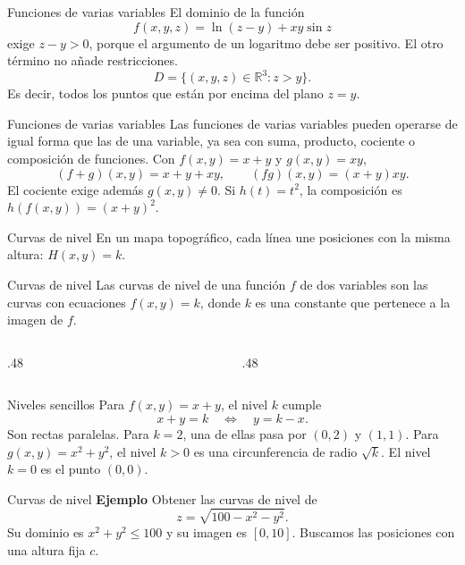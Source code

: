 \begin{frame}{Funciones de varias variables}
El dominio de la función
\[f(x,y,z)=\ln(z-y)+xy\sin z\]
exige $z-y>0$, porque el argumento de un logaritmo debe ser positivo. El otro término no añade restricciones.
\[D=\{(x,y,z)\in\mathbb{R}^3:z>y\}.\]
Es decir, todos los puntos que están por encima del plano $z=y$.
\end{frame}
\begin{frame}{Funciones de varias variables}
Las funciones de varias variables pueden operarse de igual forma que las de una variable, ya sea con suma, producto, cociente o composición de funciones.
\medskip
Con $f(x,y)=x+y$ y $g(x,y)=xy$,
\[(f+g)(x,y)=x+y+xy,\qquad (fg)(x,y)=(x+y)xy.\]
El cociente exige además $g(x,y)\ne0$.
\medskip
Si $h(t)=t^2$, la composición es $h(f(x,y))=(x+y)^2$.
\end{frame}
\begin{frame}{Curvas de nivel}
En un mapa topográfico, cada línea une posiciones con la misma altura: $H(x,y)=k$.
\end{frame}
\begin{frame}{Curvas de nivel}
Las curvas de nivel de una función $f$ de dos variables son las curvas con ecuaciones $f(x,y)=k$, donde $k$ es una constante que pertenece a la imagen de $f$.
\begin{columns}[c]
\begin{column}{.48\textwidth}\end{column}
\begin{column}{.48\textwidth}\end{column}
\end{columns}
\end{frame}
\begin{frame}{Niveles sencillos}
Para $f(x,y)=x+y$, el nivel $k$ cumple
\[x+y=k\quad\Longleftrightarrow\quad y=k-x.\]
Son rectas paralelas. Para $k=2$, una de ellas pasa por $(0,2)$ y $(1,1)$.
\medskip
Para $g(x,y)=x^2+y^2$, el nivel $k>0$ es una circunferencia de radio $\sqrt k$. El nivel $k=0$ es el punto $(0,0)$.
\end{frame}
\begin{frame}{Curvas de nivel}
\textbf{Ejemplo}
\vfill
Obtener las curvas de nivel de
\[z=\sqrt{100-x^2-y^2}.\]
Su dominio es $x^2+y^2\le100$ y su imagen es $[0,10]$.
\medskip
Buscamos las posiciones con una altura fija $c$.
\vfill
\end{frame}
